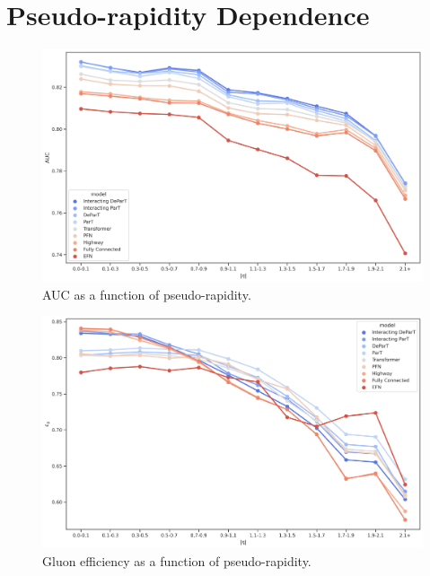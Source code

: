 \FloatBarrier

\section{Pseudo-rapidity Dependence}
\label{sec:app_eta_dep}

\begin{figure}[htb]
    \centering
    \includegraphics[width=0.95\linewidth]{src/plots/results/eta_dep/auc.jpg}
    \caption{AUC as a function of pseudo-rapidity.}
    \label{fig:auc_eta}
\end{figure}

\begin{figure}[htb]
    \centering
    \includegraphics[width=0.95\linewidth]{src/plots/results/eta_dep/gluon_efficiency.jpg}
    \caption{Gluon efficiency as a function of pseudo-rapidity.}
    \label{fig:gluon_eff_eta}
\end{figure}

